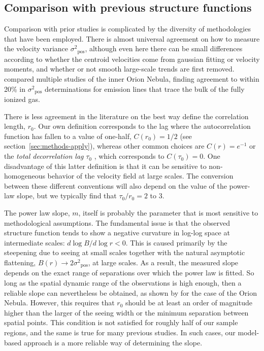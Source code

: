 \documentclass[fleqn,usenatbib, useAMS, a4paper]{mnras}
\newcommand\pos{\ensuremath{_{\mathrm{pos}}}}
\begin{document}
\subsection{Comparison with previous structure functions}
\label{sec:comp-with-prev}
Comparison with prior studies is complicated by the
diversity of methodologies that  have been employed.
There is almost universal agreement on how to measure
the velocity variance \(\sigma^2\pos\),
although even here there can be small differences according
to whether the centroid velocities come from gaussian fitting
or velocity moments,
and whether or not smooth large-scale trends are first removed.
\citet{arthur2016turbulence} compared multiple studies of the
inner Orion Nebula, finding agreement to within 20\%
in \(\sigma^2\pos\) determinations
for emission lines that trace the bulk of the fully ionized gas.

There is less agreement in the literature on the best way
define the correlation length, \(r_0\).
Our own definition corresponds to the lag where the autocorrelation function
has fallen to a value of one-half,
\(C(r_0) = 1/2\) (see section~\ref{sec:methods-apply}),
whereas other common choices are \(C(r) = e^{-1}\)
\citep{Mivi1995}
or the \textit{total decorrelation lag} \(\tau_0\) \citep{lagrois2011},
which corresponds to \(C(\tau_0) = 0\).
One disadvantage of this latter definition is that it
can be sensitive to non-homogeneous behavior of the
velocity field at large scales. 
The conversion between these different conventions will also depend
on the value of the power-law slope,
but we typically find that \(\tau_0 / r_0 = \num{2}\) to \num{3}.

The power law slope, \(m\), itself is probably the parameter that
is most sensitive to methodological assumptions.
The fundamental issue is that the observed structure function tends to
show a negative curvature in log-log space at intermediate scales:
\(d\log B/ d\log r < 0\).
This is caused primarily by the steepening due to seeing at small scales
together with the natural asymptotic flattening, 
\(B(r) \to 2 \sigma^2\pos\), at large scales.
As a result, the measured slope depends on the exact range of
separations over which the power law is fitted.
So long as the spatial dynamic range of the observations is high enough,
then a reliable slope can nevertheless be obtained,
as shown by \citet{arthur2016turbulence} for the case of the Orion Nebula.
However, this requires that \(r_0\) should be at least an order of
magnitude higher than the larger of the seeing width
or the minimum separation between spatial points.
This condition is not satisfied for roughly half of our sample regions,
and the same is true for many previous studies.
In such cases, our model-based approach is a more reliable way of
determining the slope. 
\end{document}
